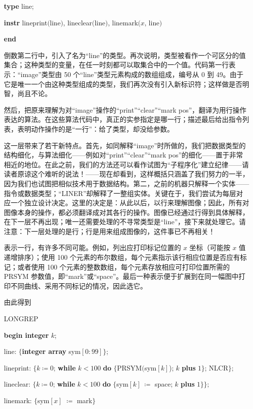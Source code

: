 \documentclass[twoside,11pt,fontset=none]{ctexbook}
\begin{document}
\quad \textbf{type} line;

\quad \textbf{instr} lineprint$($line$)$, lineclear$($line$)$, linemark$(x$, line$)$

\textbf{end}

倒数第二行中，引入了名为“line”的类型。再次说明，类型被看作一个可区分的值集合；这种类型的变量，在任一时刻都可以取集合中的一个值。代码第一行表示：“image”类型由 50 个“line”类型元素构成的数组组成，编号从 0 到 49。由于它是唯一一个由这种类型组成的类型，我们再次没有引入新标识符；这样做是否明智，尚且不论。

然后，把原来理解为对“image”操作的“print”“clear”“mark pos”，翻译为用行操作表达的算法。在这些算法代码中，真正的实参指定是哪一行；描述最后给出指令列表，表明动作操作的是“一行”：给了类型，却没给参数。

这一层带来了若干新特点。首先，如同解释“image”时所做的，我们把数据类型的结构细化，与算法细化——例如对“print”“clear”“mark pos”的细化——置于非常相近的地位。在此之前，我们的方法还可以看作试图为“子程序化”建立纪律——请读者原谅这个难听的说法！——现在却看到，这样概括只涵盖了我们努力的一半，因为我们也试图把相似技术用于数据结构。第二，之前的机器只解释一个实体——指令或数据类型；“LINER”却解释了一整组实体。关键在于，我们尝试为每层对应一个独立设计决定。这里的决定是：从此以后，以行来理解图像；因此，所有对图像本身的操作，都必须翻译成对其各行的操作。图像已经通过行得到具体解释，在下一层不再出现；唯一还需要处理的不寻常类型是“line”，接下来就处理它。请注意：下一层处理的是行；行是用来组成图像的，这件事已不再相关！

表示一行，有许多不同可能。例如，列出应打印标记位置的 $x$ 坐标（可能按 $x$ 值递增排序）；使用 100 个元素的布尔数组，每个元素指示该行相应位置是否应有标记；或者使用 100 个元素的整数数组，每个元素存放相应可打印位置所需的 PRSYM 参数值，即“mark”或“space”。最后一种表示便于扩展到在同一幅图中打印不同曲线、采用不同标记的情况，因此选它。

由此得到

\noindent
LONGREP

\noindent
\textbf{begin integer} $k$;

\noindent
\quad line: $\{$\textbf{integer array} sym$[0 : 99]\}$;

\noindent
\quad lineprint: $\{k \coloneq 0$; \textbf{while} $k < 100$ \textbf{do} $\{$PRSYM$($sym$[k]$); $k$ \textbf{plus} $1\}$; NLCR$\};$

\noindent
\quad lineclear: $\{k \coloneq 0$; \textbf{while} $k < 100$ \textbf{do} $\{$sym$[k]\ \coloneq$ space; $k$ \textbf{plus} $1\}\};$

\noindent
\quad linemark: $\{$sym$[x]$ $\coloneq$ mark$\}$
\end{document}
